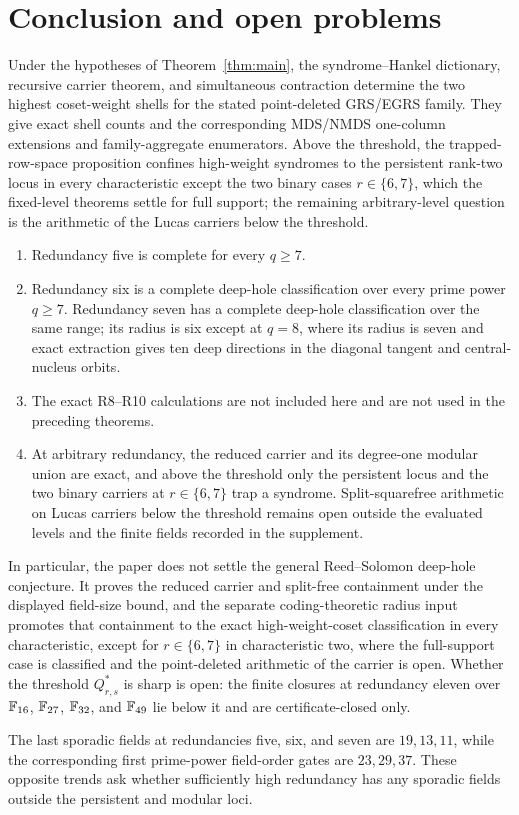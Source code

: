 \section{Conclusion and open problems}\label{sec:boundary}

Under the hypotheses of Theorem~\ref{thm:main}, the syndrome--Hankel
dictionary, recursive carrier theorem, and simultaneous contraction determine
the two highest coset-weight shells for the stated point-deleted GRS/EGRS
family.  They give exact shell counts and the corresponding MDS/NMDS
one-column extensions and family-aggregate enumerators.  Above the
threshold, the trapped-row-space proposition confines high-weight syndromes
to the persistent rank-two locus in every characteristic except the two
binary cases \(r\in\{6,7\}\), which the fixed-level theorems settle for full
support; the
remaining arbitrary-level question is the arithmetic of the Lucas carriers
below the threshold.
\begin{enumerate}[leftmargin=2em]
\item Redundancy five is complete for every $q\geq7$.
\item Redundancy six is a complete deep-hole classification over every
      prime power \(q\geq7\).  Redundancy seven has a complete deep-hole
      classification over the same range; its radius is six except at
      $q=8$, where its radius is seven and
      exact extraction gives ten deep directions in the diagonal tangent and
      central-nucleus orbits.
\item The exact R8--R10 calculations are not included here and are not used
      in the preceding theorems.
\item At arbitrary redundancy, the reduced carrier and its degree-one modular
      union are exact, and above the threshold only the persistent locus and
      the two binary carriers at \(r\in\{6,7\}\) trap a syndrome.
      Split-squarefree arithmetic on Lucas carriers below the threshold
      remains open outside the evaluated levels and the finite fields recorded
      in the supplement.
\end{enumerate}

In particular, the paper does not settle the general Reed--Solomon
deep-hole conjecture.  It proves the reduced carrier and split-free
containment under the displayed field-size bound, and the separate
coding-theoretic radius input promotes that containment to the exact
high-weight-coset classification in every characteristic, except for
\(r\in\{6,7\}\) in characteristic two, where the full-support case is
classified and the point-deleted arithmetic of the carrier is open.  Whether the
threshold \(Q^*_{r,s}\) is sharp is open: the finite closures at redundancy
eleven over \(\mathbb F_{16}\), \(\mathbb F_{27}\), \(\mathbb F_{32}\), and \(\mathbb F_{49}\) lie below
it and are certificate-closed only.

The last sporadic fields at redundancies five, six, and seven are
\(19,13,11\), while the corresponding first prime-power field-order gates
are \(23,29,37\).  These opposite trends ask whether sufficiently high
redundancy has any sporadic fields outside the persistent and modular
loci.
